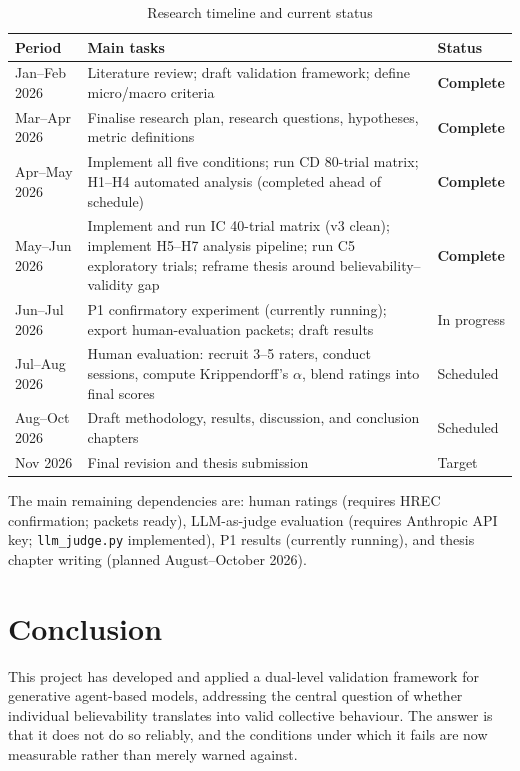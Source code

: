 \documentclass[11pt]{article}
\begin{document}
\begin{table}[h]
\centering
\caption{Research timeline and current status}
\label{tab:timeline}
\begin{tabular}{p{}p{}p{}}
\toprule
Period & Main tasks & Status \\
\midrule
Jan--Feb 2026 & Literature review; draft validation framework; define micro/macro criteria & \textbf{Complete} \\
Mar--Apr 2026 & Finalise research plan, research questions, hypotheses, metric definitions & \textbf{Complete} \\
Apr--May 2026 & Implement all five conditions; run CD 80-trial matrix; H1--H4 automated analysis (completed ahead of schedule) & \textbf{Complete} \\
May--Jun 2026 & Implement and run IC 40-trial matrix (v3 clean); implement H5--H7 analysis pipeline; run C5 exploratory trials; reframe thesis around believability--validity gap & \textbf{Complete} \\
Jun--Jul 2026 & P1 confirmatory experiment (currently running); export human-evaluation packets; draft results & In progress \\
Jul--Aug 2026 & Human evaluation: recruit 3--5 raters, conduct sessions, compute Krippendorff's $\alpha$, blend ratings into final scores & Scheduled \\
Aug--Oct 2026 & Draft methodology, results, discussion, and conclusion chapters & Scheduled \\
Nov 2026 & Final revision and thesis submission & Target \\
\bottomrule
\end{tabular}
\end{table}

The main remaining dependencies are: human ratings (requires HREC confirmation; packets ready), LLM-as-judge evaluation (requires Anthropic API key; \texttt{llm\_judge.py} implemented), P1 results (currently running), and thesis chapter writing (planned August--October 2026).

\section{Conclusion}

This project has developed and applied a dual-level validation framework for generative agent-based models, addressing the central question of whether individual believability translates into valid collective behaviour. The answer is that it does not do so reliably, and the conditions under which it fails are now measurable rather than merely warned against.
\end{document}
